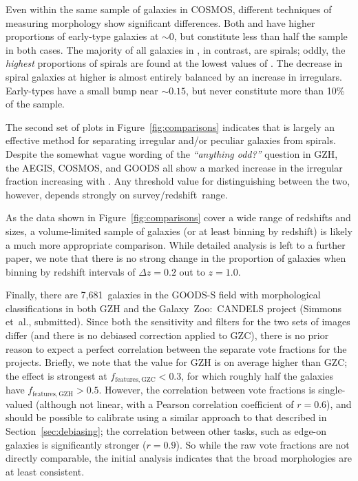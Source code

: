 \documentclass[twocolumn]{aastex6}
\begin{document}
Even within the same sample of galaxies in COSMOS, different techniques of
measuring morphology show significant differences. Both \citet{cas07} and
\citet{tas11} have higher proportions of early-type galaxies at \fbest$\sim0$,
but constitute less than half the sample in both cases. The majority of all
galaxies in \citet{sca07}, in contrast, are spirals; oddly, the \emph{highest}
proportions of spirals are found at the lowest values of \fbest. The decrease
in spiral galaxies at higher \fbest{} is almost entirely balanced by an
increase in irregulars. Early-types have a small bump near \fbest$\sim0.15$,
but never constitute more than 10\% of the sample. 

The second set of plots in Figure~\ref{fig:comparisons} indicates that \fodd{}
is largely an effective method for separating irregular and/or peculiar
galaxies from spirals. Despite the somewhat vague wording of the {\it
``anything odd?''} question in GZH, the AEGIS, COSMOS, and GOODS all show a
marked increase in the irregular fraction increasing with \fodd. Any threshold
value for distinguishing between the two, however, depends strongly on
survey/redshift~range. 

As the data shown in Figure~\ref{fig:comparisons} cover a wide range of
redshifts and sizes, a volume-limited sample of galaxies (or at least binning
by redshift) is likely a much more appropriate comparison. While detailed
analysis is left to a further paper, we note that there is no strong change in
the proportion of galaxies when binning by redshift intervals of $\Delta z=0.2$
out to $z=1.0$. 

Finally, there are 7,681~galaxies in the GOODS-S field with morphological
classifications in both GZH and the Galaxy~Zoo:~CANDELS project (Simmons
et~al., submitted). Since both the sensitivity and filters for the two sets of
images differ (and there is no debiased correction applied to GZC), there is no
prior reason to expect a perfect correlation between the separate vote
fractions for the projects. Briefly, we note that the \ffeatures{} value for
GZH is on average higher than GZC; the effect is strongest at
$f_\mathrm{features,GZC}<0.3$, for which roughly half the galaxies have
$f_\mathrm{features,GZH}>0.5$. However, the correlation between vote fractions
is single-valued (although not linear, with a Pearson correlation coefficient
of $r=0.6$), and should be possible to calibrate using a similar approach to
that described in Section~\ref{sec:debiasing}; the correlation between other
tasks, such as edge-on galaxies is significantly stronger ($r=0.9$). So while
the raw vote fractions are not directly comparable, the initial analysis
indicates that the broad morphologies are at least consistent.
\end{document}
